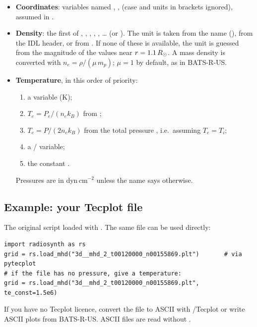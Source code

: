 \begin{itemize}[itemsep=2pt]
\item \textbf{Coordinates}: variables named , ,  (case and units
      in brackets ignored), assumed in \rsun.
\item \textbf{Density}: the first of , , , ,
      , \ldots{} (or ). The unit is taken from the name
      (), from the IDL header, or from .
      If none of these is available, the unit is guessed from the magnitude of the
      values near $r=1.1\,R_\odot$. A mass density is converted with
      $n_e=\rho/(\mu\, m_p)$; $\mu=1$ by default, as in BATS-R-US.
\item \textbf{Temperature}, in this order of priority:
  \begin{enumerate}[itemsep=0pt]
    \item a  variable (K);
    \item $T_e=P_e/(n_e k_B)$ from ;
    \item $T_e=P/(2n_e k_B)$ from the total pressure , i.e.\ assuming $T_e=T_i$;
    \item a / variable;
    \item the constant .
  \end{enumerate}
  Pressures are in dyn\,cm$^{-2}$ unless the name says otherwise.
\end{itemize}

\subsection*{Example: your Tecplot file}
The original script  loaded
 with . The same file can be
used directly:

\begin{lstlisting}[style=pyex]
import radiosynth as rs
grid = rs.load_mhd("3d__mhd_2_t00120000_n00155869.plt")       # via pytecplot
# if the file has no pressure, give a temperature:
grid = rs.load_mhd("3d__mhd_2_t00120000_n00155869.plt", te_const=1.5e6)
\end{lstlisting}

If you have no Tecplot licence, convert the file to ASCII with /Tecplot or
write  ASCII plots from BATS-R-US. ASCII files are read without .

